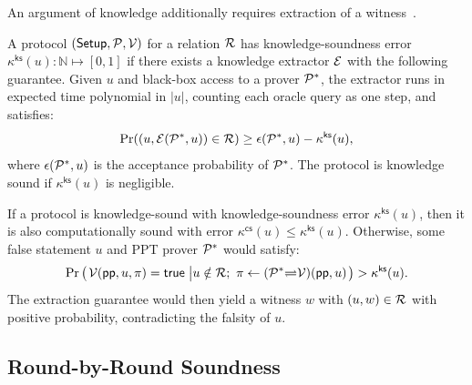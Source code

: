 An argument of knowledge additionally requires extraction of a
witness~\cite{crypto/AttemaCK21}.
\begin{definition}
	\label{def:knowledgeSoundness}
	A protocol $({\sf Setup},\mathcal{P},\mathcal{V})$ for a relation $\mathcal{R}$
    has knowledge-soundness error
    $\kappa^\mathsf{ks}(u)\colon\mathbb N\mapsto[0,1]$ if there
    exists a knowledge extractor $\mathcal{E}$ with the following
    guarantee. Given $u$ and black-box access to a prover $\mathcal{P}^*$,
    the extractor runs in expected time polynomial in $|u|$, counting
    each oracle query as one step, and satisfies:
	\begin{equation*}
	\Pr((u, \mathcal{E}(\mathcal{P}^*, u) ) \in \mathcal{R} )
	\ge
	\epsilon(\mathcal{P}^*, u) - \kappa^\mathsf{ks}(u),
	\end{equation*}
	where $\epsilon(\mathcal{P}^*,u)$ is the acceptance probability of
    $\mathcal{P}^*$. The protocol is knowledge sound if
    $\kappa^\mathsf{ks}(u)$ is negligible.
\end{definition}

If a protocol is knowledge-sound with knowledge-soundness error
$\kappa^\mathsf{ks}(u)$, then it is also computationally sound with
error $\kappa^\mathsf{cs}(u) \le \kappa^\mathsf{ks}(u)$.
Otherwise, some false statement $u$ and PPT prover $\mathcal{P}^*$
would satisfy:
\[
	\Pr
	\left(
		\left.
		\begin{aligned}
			& \mathcal{V}({\sf pp}, u, \pi) = {\sf true} \\
		\end{aligned}
		\right.
		\left|
		\begin{aligned}
			& u \notin \mathcal{R};~ \pi \leftarrow (\mathcal{P}^* {\rightleftharpoons} \mathcal{V})({\sf pp}, u) \\
		\end{aligned}
		\right.
	\right)
	> \kappa^\mathsf{ks}(u).
\]
The extraction guarantee would then yield a witness $w$ with
$(u,w)\in\mathcal{R}$ with positive probability, contradicting the
falsity of $u$.


\subsection{Round-by-Round Soundness}
\label{appx:rbyDef}

